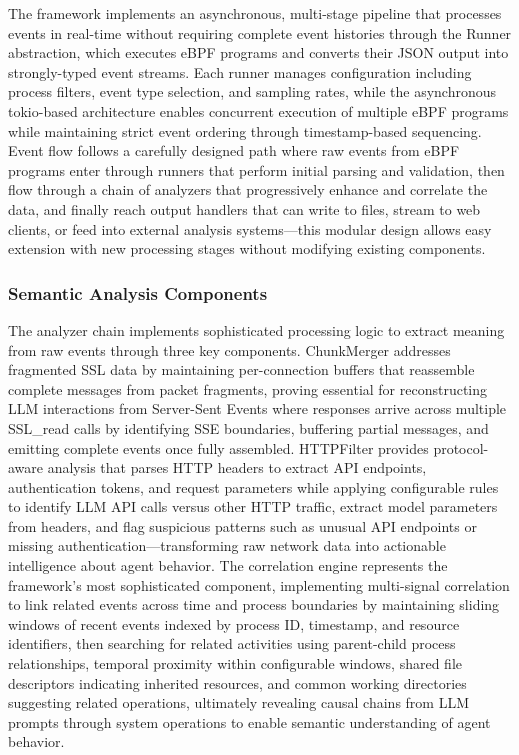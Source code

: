 The framework implements an asynchronous, multi-stage pipeline that processes events in real-time without requiring complete event histories through the Runner abstraction, which executes eBPF programs and converts their JSON output into strongly-typed event streams. Each runner manages configuration including process filters, event type selection, and sampling rates, while the asynchronous tokio-based architecture enables concurrent execution of multiple eBPF programs while maintaining strict event ordering through timestamp-based sequencing. Event flow follows a carefully designed path where raw events from eBPF programs enter through runners that perform initial parsing and validation, then flow through a chain of analyzers that progressively enhance and correlate the data, and finally reach output handlers that can write to files, stream to web clients, or feed into external analysis systems—this modular design allows easy extension with new processing stages without modifying existing components.

\subsubsection{Semantic Analysis Components}

The analyzer chain implements sophisticated processing logic to extract meaning from raw events through three key components. ChunkMerger addresses fragmented SSL data by maintaining per-connection buffers that reassemble complete messages from packet fragments, proving essential for reconstructing LLM interactions from Server-Sent Events where responses arrive across multiple SSL\_read calls by identifying SSE boundaries, buffering partial messages, and emitting complete events once fully assembled. HTTPFilter provides protocol-aware analysis that parses HTTP headers to extract API endpoints, authentication tokens, and request parameters while applying configurable rules to identify LLM API calls versus other HTTP traffic, extract model parameters from headers, and flag suspicious patterns such as unusual API endpoints or missing authentication—transforming raw network data into actionable intelligence about agent behavior. The correlation engine represents the framework's most sophisticated component, implementing multi-signal correlation to link related events across time and process boundaries by maintaining sliding windows of recent events indexed by process ID, timestamp, and resource identifiers, then searching for related activities using parent-child process relationships, temporal proximity within configurable windows, shared file descriptors indicating inherited resources, and common working directories suggesting related operations, ultimately revealing causal chains from LLM prompts through system operations to enable semantic understanding of agent behavior.


